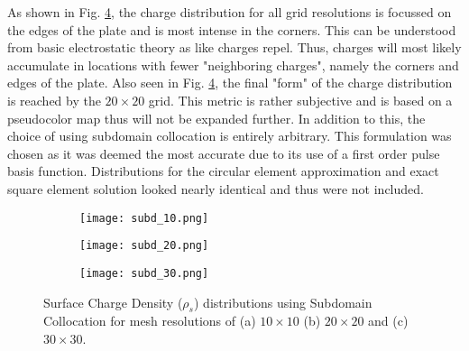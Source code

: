 As shown in Fig. \ref{fig:charge_d}, the charge distribution for all grid resolutions is focussed on the edges of the plate and is most intense in the corners. This can be understood from basic electrostatic theory as like charges repel. Thus, charges will most likely accumulate in locations with fewer "neighboring charges", namely the corners and edges of the plate. Also seen in Fig. \ref{fig:charge_d}, the final "form" of the charge distribution is reached by the $20\times 20$ grid. This metric is rather subjective and is based on a pseudocolor map thus will not be expanded further. In addition to this, the choice of using subdomain collocation is entirely arbitrary. This formulation was chosen as it was deemed the most accurate due to its use of a first order pulse basis function. Distributions for the circular element approximation and exact square element solution looked nearly identical and thus were not included.

\begin{figure}[t!]
	\begin{subfigure}{\linewidth} %
		\centering
		\texttt{[image: subd\_10.png]} %
		\caption{}
		\label{subfig:d10}
	\end{subfigure}
	\begin{subfigure}{\linewidth}
		\centering
		\texttt{[image: subd\_20.png]} %
		\caption{} %
		\label{subfig:d20}
	\end{subfigure}
	\begin{subfigure}{\linewidth}
		\centering
		\texttt{[image: subd\_30.png]} %
		\caption{} %
		\label{subfig:d30}
	\end{subfigure}
	\caption{Surface Charge Density ($\rho_s$) distributions using Subdomain Collocation for mesh resolutions of (a) $10\times10$ (b) $20\times20$ and (c) $30\times30$.}
	\label{fig:charge_d}
\end{figure}


